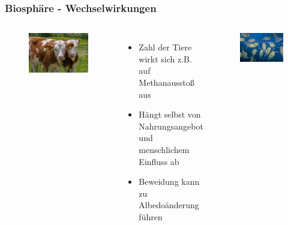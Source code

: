 \begin{frame}
	\frametitle{Biosphäre - Wechselwirkungen}
	\begin{columns}
		\begin{figure}
			\centering
			\includegraphics[trim={0cm 0cm 0cm 0.1cm}, clip,width=\linewidth]{bilder/kuehe}
		\end{figure}
			\begin{itemize}
				\item Zahl der Tiere wirkt sich z.B. auf Methanausstoß aus
				\item Hängt selbst von Nahrungsangebot und menschlichem Einfluss ab
				\item Beweidung kann zu Albedoänderung führen
			\end{itemize}
		\begin{figure}
			\centering
			\includegraphics[width=\linewidth]{bilder/plankton}

\end{figure}
\end{columns}
\end{frame}
